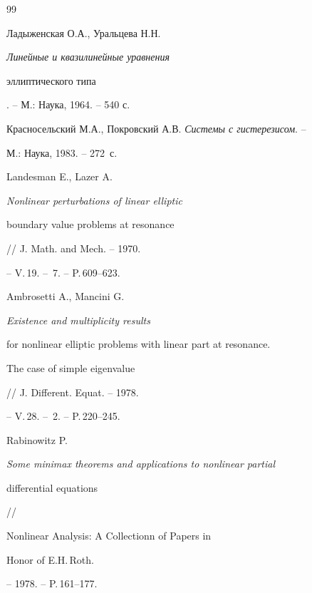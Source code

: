 \begin{thebibliography}{99}







Ладыженская О.А., Уральцева Н.Н. {\em Линейные и квазилинейные уравнения


эллиптического типа}. -- М.: Наука, 1964. -- 540 с.







Красносельский М.А., Покровский А.В. {\em Системы с гистерезисом}. --


М.: Наука, 1983. -- 272~с.







Landesman E., Lazer A. {\em Nonlinear perturbations of linear elliptic


boundary value problems at resonance} // J. Math. and Mech. -- 1970.


-- V.\,19. -- \No\,7. -- P.\,609--623.







Ambrosetti A., Mancini G. {\em Existence and multiplicity results


for nonlinear elliptic problems with linear part at resonance.


The case of simple eigenvalue} // J. Different. Equat. -- 1978.


-- V.\,28. -- \No\,2. -- P.\,220--245.







Rabinowitz P. {\em Some minimax theorems and applications to nonlinear partial


differential equations} //


Nonlinear Analysis: A Collectionn of Papers in


Honor of E.H.\,Roth.






-- 1978. -- P.\,161--177.








\end{thebibliography}
